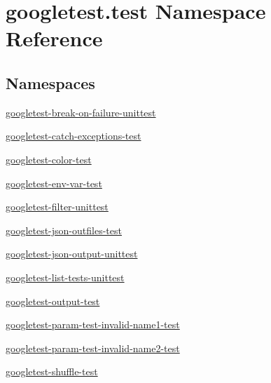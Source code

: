 \hypertarget{namespacegoogletest_1_1test}{}\section{googletest.\+test Namespace Reference}
\label{namespacegoogletest_1_1test}
\subsection*{Namespaces}
\begin{DoxyCompactItemize}
\item 
 \mbox{\hyperlink{namespacegoogletest_1_1test_1_1googletest-break-on-failure-unittest}{googletest-\/break-\/on-\/failure-\/unittest}}
\item 
 \mbox{\hyperlink{namespacegoogletest_1_1test_1_1googletest-catch-exceptions-test}{googletest-\/catch-\/exceptions-\/test}}
\item 
 \mbox{\hyperlink{namespacegoogletest_1_1test_1_1googletest-color-test}{googletest-\/color-\/test}}
\item 
 \mbox{\hyperlink{namespacegoogletest_1_1test_1_1googletest-env-var-test}{googletest-\/env-\/var-\/test}}
\item 
 \mbox{\hyperlink{namespacegoogletest_1_1test_1_1googletest-filter-unittest}{googletest-\/filter-\/unittest}}
\item 
 \mbox{\hyperlink{namespacegoogletest_1_1test_1_1googletest-json-outfiles-test}{googletest-\/json-\/outfiles-\/test}}
\item 
 \mbox{\hyperlink{namespacegoogletest_1_1test_1_1googletest-json-output-unittest}{googletest-\/json-\/output-\/unittest}}
\item 
 \mbox{\hyperlink{namespacegoogletest_1_1test_1_1googletest-list-tests-unittest}{googletest-\/list-\/tests-\/unittest}}
\item 
 \mbox{\hyperlink{namespacegoogletest_1_1test_1_1googletest-output-test}{googletest-\/output-\/test}}
\item 
 \mbox{\hyperlink{namespacegoogletest_1_1test_1_1googletest-param-test-invalid-name1-test}{googletest-\/param-\/test-\/invalid-\/name1-\/test}}
\item 
 \mbox{\hyperlink{namespacegoogletest_1_1test_1_1googletest-param-test-invalid-name2-test}{googletest-\/param-\/test-\/invalid-\/name2-\/test}}
\item 
 \mbox{\hyperlink{namespacegoogletest_1_1test_1_1googletest-shuffle-test}{googletest-\/shuffle-\/test}}
\item 

\end{DoxyCompactItemize}
